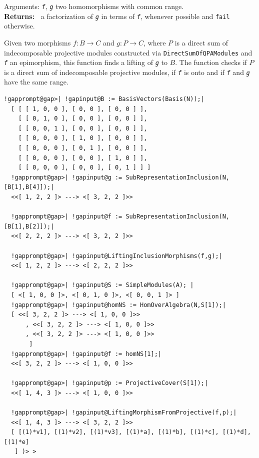\documentclass[a4paper,11pt]{report}
\begin{document}
{{{ Arguments: \mbox{\texttt{\mdseries\slshape f}}, \mbox{\texttt{\mdseries\slshape g}} \texttt{} two homomorphisms with common range.\\
 \textbf{\indent Returns:\ }
 a factorization of \mbox{\texttt{\mdseries\slshape g}} in terms of \mbox{\texttt{\mdseries\slshape f}}, whenever possible and \texttt{fail} otherwise. 



 Given two morphisms $f\colon B\to C$ and $g\colon P\to C$, where $P$ is a direct sum of indecomposable projective modules constructed via \texttt{DirectSumOfQPAModules} and \mbox{\texttt{\mdseries\slshape f}} an epimorphism, this function finds a lifting of \mbox{\texttt{\mdseries\slshape g}} to $B$. The function checks if $P$ is a direct sum of indecomposable projective modules, if \mbox{\texttt{\mdseries\slshape f}} is onto and if \mbox{\texttt{\mdseries\slshape f}} and \mbox{\texttt{\mdseries\slshape g}} have the same range. }

 
\begin{Verbatim}[commandchars=!@|,fontsize=\small,frame=single,label=Example]
  !gapprompt@gap>| !gapinput@B := BasisVectors(Basis(N));|
  [ [ [ 1, 0, 0 ], [ 0, 0 ], [ 0, 0 ] ], 
    [ [ 0, 1, 0 ], [ 0, 0 ], [ 0, 0 ] ], 
    [ [ 0, 0, 1 ], [ 0, 0 ], [ 0, 0 ] ], 
    [ [ 0, 0, 0 ], [ 1, 0 ], [ 0, 0 ] ], 
    [ [ 0, 0, 0 ], [ 0, 1 ], [ 0, 0 ] ], 
    [ [ 0, 0, 0 ], [ 0, 0 ], [ 1, 0 ] ], 
    [ [ 0, 0, 0 ], [ 0, 0 ], [ 0, 1 ] ] ]
  !gapprompt@gap>| !gapinput@g := SubRepresentationInclusion(N,[B[1],B[4]]);|
  <<[ 1, 2, 2 ]> ---> <[ 3, 2, 2 ]>>
  
  !gapprompt@gap>| !gapinput@f := SubRepresentationInclusion(N,[B[1],B[2]]);|
  <<[ 2, 2, 2 ]> ---> <[ 3, 2, 2 ]>>
  
  !gapprompt@gap>| !gapinput@LiftingInclusionMorphisms(f,g);|
  <<[ 1, 2, 2 ]> ---> <[ 2, 2, 2 ]>>
  
  !gapprompt@gap>| !gapinput@S := SimpleModules(A); |
  [ <[ 1, 0, 0 ]>, <[ 0, 1, 0 ]>, <[ 0, 0, 1 ]> ]
  !gapprompt@gap>| !gapinput@homNS := HomOverAlgebra(N,S[1]);|
  [ <<[ 3, 2, 2 ]> ---> <[ 1, 0, 0 ]>>
      , <<[ 3, 2, 2 ]> ---> <[ 1, 0, 0 ]>>
      , <<[ 3, 2, 2 ]> ---> <[ 1, 0, 0 ]>>
       ]
  !gapprompt@gap>| !gapinput@f := homNS[1];|
  <<[ 3, 2, 2 ]> ---> <[ 1, 0, 0 ]>>
  
  !gapprompt@gap>| !gapinput@p := ProjectiveCover(S[1]);|
  <<[ 1, 4, 3 ]> ---> <[ 1, 0, 0 ]>>
  
  !gapprompt@gap>| !gapinput@LiftingMorphismFromProjective(f,p);|
  <<[ 1, 4, 3 ]> ---> <[ 3, 2, 2 ]>>
  [ [(1)*v1], [(1)*v2], [(1)*v3], [(1)*a], [(1)*b], [(1)*c], [(1)*d], [(1)*e] 
   ] )> > 
\end{Verbatim}
 

}}
\end{document}

